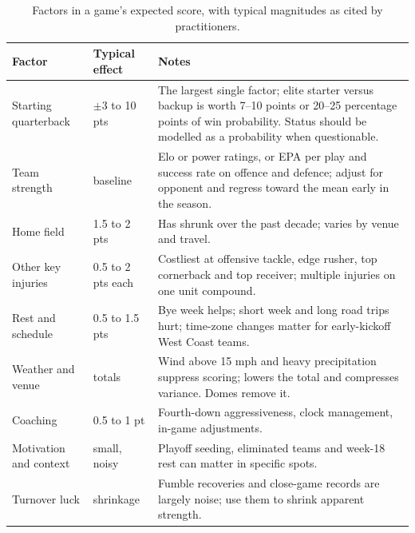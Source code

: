 \begin{table}[H]
\centering
\small
\begin{tabular}{p{3cm}p{2.4cm}p{8.4cm}}
\toprule
\textbf{Factor} & \textbf{Typical effect} & \textbf{Notes} \\
\midrule
Starting quarterback & $\pm$3 to 10 pts & The largest single factor; elite starter versus backup is worth 7--10 points or 20--25 percentage points of win probability. Status should be modelled as a probability when questionable. \\
Team strength & baseline & Elo or power ratings, or EPA per play and success rate on offence and defence; adjust for opponent and regress toward the mean early in the season. \\
Home field & 1.5 to 2 pts & Has shrunk over the past decade; varies by venue and travel. \\
Other key injuries & 0.5 to 2 pts each & Costliest at offensive tackle, edge rusher, top cornerback and top receiver; multiple injuries on one unit compound. \\
Rest and schedule & 0.5 to 1.5 pts & Bye week helps; short week and long road trips hurt; time-zone changes matter for early-kickoff West Coast teams. \\
Weather and venue & totals & Wind above 15 mph and heavy precipitation suppress scoring; lowers the total and compresses variance. Domes remove it. \\
Coaching & 0.5 to 1 pt & Fourth-down aggressiveness, clock management, in-game adjustments. \\
Motivation and context & small, noisy & Playoff seeding, eliminated teams and week-18 rest can matter in specific spots. \\
Turnover luck & shrinkage & Fumble recoveries and close-game records are largely noise; use them to shrink apparent strength. \\
\bottomrule
\end{tabular}
\caption{Factors in a game's expected score, with typical magnitudes as cited by practitioners.}
\label{tab:factors}
\end{table}
